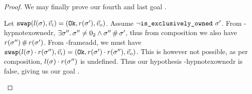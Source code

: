 \begin{proof}

We may finally prove our fourth and last goal .

\begin{hypvlist}
	 Let $\texttt{swap}(l(\sigma),\vec{v}_i)=(\texttt{Ok},r(\sigma'),\vec{v}_o)$.
	 Assume $\neg\texttt{is\_exclusively\_owned}~\sigma'$.
	 From \hyp{hypnotexownedr}, $\exists \sigma''\ldotp \sigma''\neq0_2 \land \sigma''\operatorname{\#}\sigma'$, thus from composition we also have $r(\sigma'')\operatorname{\#} r(\sigma')$.%
	 From \hyp{frameadd}, we must have $\texttt{swap}(l(\sigma)\cdot r(\sigma''),\vec{v}_i)=(\texttt{Ok},r(\sigma')\cdot r(\sigma''),\vec{v}_o)$. This is however not possible, as per composition, $l(\sigma)\cdot r(\sigma'')$ is undefined. Thus our hypothesis \hyp{hypnotexownedr} is false, giving us our goal .
	
\end{hypvlist}

\end{proof}
